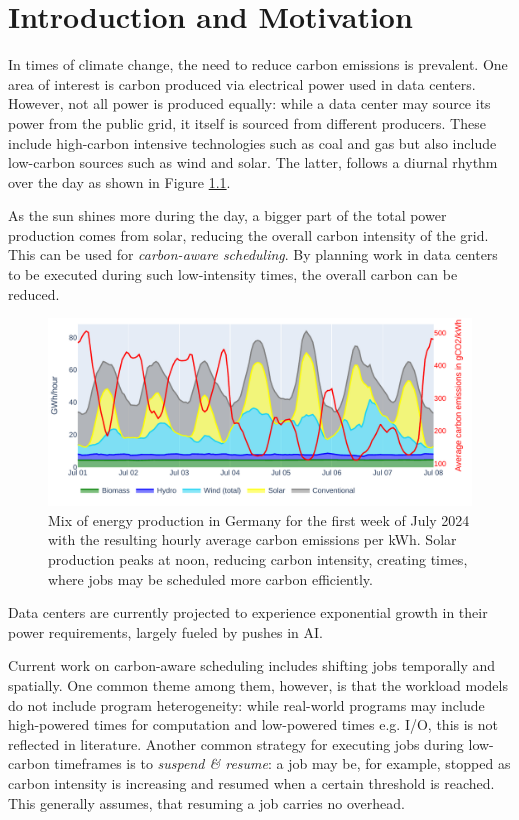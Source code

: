\chapter{Introduction and Motivation}

In times of climate change, the need to reduce carbon emissions is prevalent. 
One area of interest is carbon produced via electrical power used in data centers. 
However, not all power is produced equally: while a data center may source its power from the public grid, it itself is sourced from different producers. 
These include high-carbon intensive technologies such as coal and gas but also include low-carbon sources such as wind and solar. 
The latter, follows a diurnal rhythm over the day as shown in Figure \ref{fig:energy_mix}.

As the sun shines more during the day, a bigger part of the total power production comes from solar, reducing the overall carbon intensity of the grid.
This can be used for \emph{carbon-aware scheduling}. 
By planning work in data centers to be executed during such low-intensity times, the overall carbon can be reduced.

\begin{figure}[H] %
    \includegraphics[width=\linewidth]{agorameter/energy_production_week.pdf}
    \caption[short]{Mix of energy production in Germany for the first week of July 2024 with the resulting hourly average carbon emissions per kWh. Solar production peaks at noon, reducing carbon intensity, creating times, where jobs may be scheduled more carbon efficiently.}
    \label{fig:energy_mix}
\end{figure}

Data centers are currently projected to experience exponential growth in their power requirements, largely fueled by pushes in AI.\cite{schwartz_green_2019}

Current work on carbon-aware scheduling includes shifting jobs temporally and spatially. 
One common theme among them, however, is that the workload models do not include program heterogeneity: while real-world programs may include high-powered times for computation and low-powered times e.g. I/O, this is not reflected in literature. 
Another common strategy for executing jobs during low-carbon timeframes is to \emph{suspend \& resume}: a job may be, for example, stopped as carbon intensity is increasing and resumed when a certain threshold is reached. 
This generally assumes, that resuming a job carries no overhead. 

